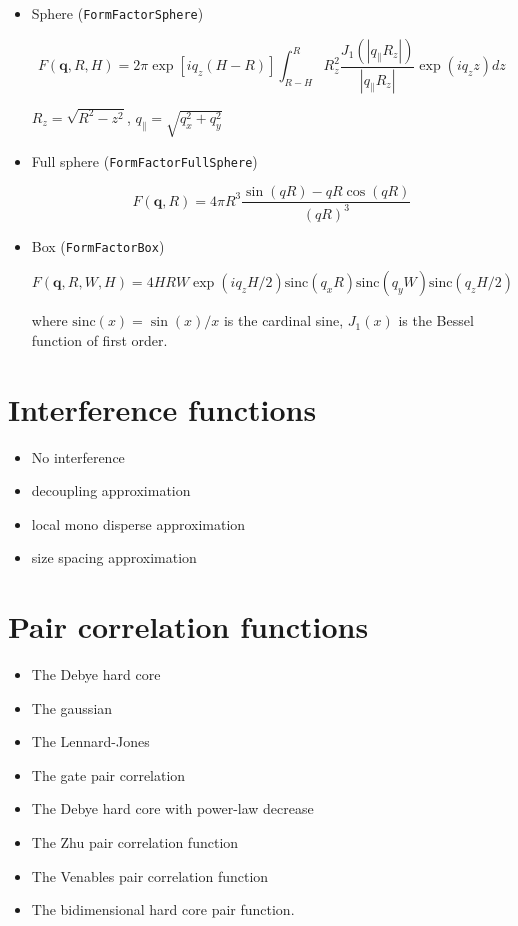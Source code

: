 \begin{itemize}
\item Sphere (\texttt{FormFactorSphere})

\begin{equation}    
F(\mathbf{q},R, H)= 2\pi \exp[i q_z (H-R)]\int_{R-H} ^{R} R_z^2 \frac{J_1(|q_{\parallel}
  R_z|) }{|q_{\parallel} R_z|}
        \exp(i q_z z) dz
\end{equation}

$R_z=\sqrt{R^2-z^2}$, $q_{\parallel}=\sqrt{q_x^2+q_y^2}$

\item Full sphere (\texttt{FormFactorFullSphere})

\begin{equation}
F(\mathbf{q},R) = 4\pi R^3 \frac{\sin(q R) - q R \cos(q R)}{(qR)^3}
\end{equation}
\item Box (\texttt{FormFactorBox})

\begin{equation}
F(\mathbf{q},R,W,H)= 4H R W\exp(i q_z H/2) \text{sinc}(q_x R) \text{sinc}(q_y W) \text{sinc}(q_z H/2)
\end{equation}
    
where $\text{sinc}(x)=\sin(x)/x$ is the cardinal sine, $J_1(x)$ is the
Bessel function of first order.
	
\end{itemize}

\chapter{Interference functions}

\begin{itemize}
\item	No interference 
\item	decoupling approximation 	
\item 	local mono disperse approximation 
\item 	size spacing approximation 
\end{itemize}


\chapter{Pair correlation functions}
\begin{itemize}
\item The Debye hard core 
\item The gaussian
\item The Lennard-Jones  	
\item The gate pair correlation 	
\item The Debye hard core with power-law decrease  	
\item The Zhu pair correlation function 	
\item The Venables pair correlation function 	
\item The bidimensional hard core pair function.
\end{itemize}